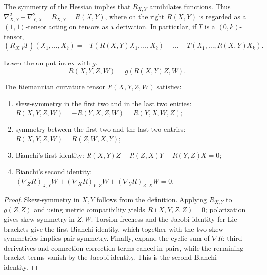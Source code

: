 \begin{remark}
  \label{rem:pet-ch3-ricci-identity-derivation}
  \leanok
  The symmetry of the Hessian implies that $R_{X,Y}$ annihilates functions. Thus
  $\nabla^2_{X,Y}-\nabla^2_{Y,X}=R_{X,Y}=R(X,Y)$, where on the right $R(X,Y)$ is
  regarded as a $(1,1)$-tensor acting on tensors as a derivation. In particular, if
  $T$ is a $(0,k)$-tensor,
  \[
    (R_{X,Y}T)(X_1,\dots,X_k)=-T(R(X,Y)X_1,\dots,X_k)-\dots-T(X_1,\dots,R(X,Y)X_k).
  \]
\end{remark}

\begin{definition}
  \label{def:pet-ch3-curvature-04-tensor}
  \leanok
  Lower the output index with $g$:
  \[
    R(X,Y,Z,W)=g(R(X,Y)Z,W).
  \]
\end{definition}

\begin{proposition}
  \label{prop:pet-ch3-curvature-symmetries}
  \leanok
  The Riemannian curvature tensor $R(X,Y,Z,W)$ satisfies:
  \begin{enumerate}
    \item[(1)] skew-symmetry in the first two and in the last two entries:
    $R(X,Y,Z,W)=-R(Y,X,Z,W)=R(Y,X,W,Z)$;
    \item[(2)] symmetry between the first two and the last two entries:
    $R(X,Y,Z,W)=R(Z,W,X,Y)$;
    \item[(3)] Bianchi's first identity: $R(X,Y)Z+R(Z,X)Y+R(Y,Z)X=0$;
    \item[(4)] Bianchi's second identity:
    $(\nabla_ZR)_{X,Y}W+(\nabla_XR)_{Y,Z}W+(\nabla_YR)_{Z,X}W=0$.
  \end{enumerate}
\end{proposition}
\begin{proof}
  \leanok
  \sketch
  Skew-symmetry in $X,Y$ follows from the definition. Applying
  $R_{X,Y}$ to $g(Z,Z)$ and using metric compatibility yields
  $R(X,Y,Z,Z)=0$; polarization gives skew-symmetry in $Z,W$.
  Torsion-freeness and the Jacobi identity for Lie brackets give the first
  Bianchi identity, which together with the two skew-symmetries implies pair
  symmetry. Finally, expand the cyclic sum of $\nabla R$: third derivatives and
  connection-correction terms cancel in pairs, while the remaining bracket terms
  vanish by the Jacobi identity. This is the second Bianchi identity.
\end{proof}


